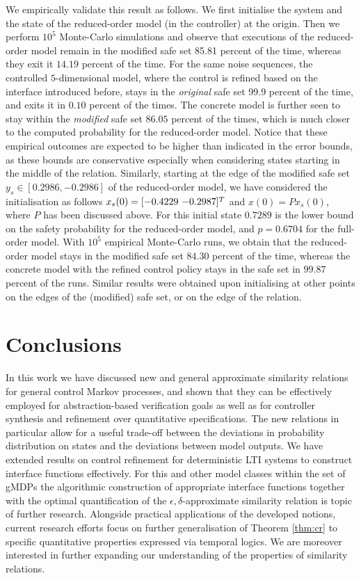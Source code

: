 \documentclass[letterpaper, 10 pt, conference]{amsart}
\theoremstyle{definition}
\theoremstyle{example}
\theoremstyle{remark}
\newcommand{\eps}{\epsilon}
\begin{document}
We empirically validate this result as follows. 
We first initialise the system and the state of the reduced-order model (in the controller)  at the origin. 
Then we perform $10^5$ Monte-Carlo simulations and observe that executions of the reduced-order model remain in the modified safe set 85.81 percent of the time, 
whereas they exit it $14.19$ percent of the time.   
For the same noise sequences,   
the controlled $5$-dimensional model, 
where the control is refined based on the interface introduced before, 
stays in the \emph{original} safe set 99.9 percent of the time, and exits it in $0.10$ percent of the times. 
The concrete model is further seen to stay within the \emph{modified} safe set $86.05$ percent of the times, 
which is much closer to the computed probability for the reduced-order model. 
Notice that these empirical outcomes are expected to be higher than indicated in the error bounds, 
as these bounds are conservative especially when considering states starting in the middle of the relation. 
Similarly, starting at the edge of the modified safe set $y_{s}\in[ 0.2986, -0.2986]$ of the reduced-order model, 
we have considered the initialisation as follows $x_s(0)=\cramped{[ -0.4229\  {-0.2987}]^T}$ and $x(0)=Px_s(0)$, 
where $P$ has been discussed above. 
For this initial state $0.7289$ is the lower bound on the safety probability for the reduced-order model, and $p= 0.6704$ for the full-order model.  
With $10^5$ empirical Monte-Carlo runs, 
we obtain that the reduced-order model stays in the modified safe set $84.30$ percent of the time, 
whereas the concrete model with the refined control policy stays in the safe set in $99.87$ percent of the runs. 
Similar results were obtained upon initialising at other points on the edges of the (modified) safe set, 
or on the edge of the relation. 
 


\section{Conclusions}

In this work we have discussed new and general approximate similarity relations for general control Markov processes, 
and shown that they can be effectively employed for abstraction-based verification goals as well as for controller synthesis and refinement over quantitative specifications.    
The new relations in particular allow for a useful trade-off between the deviations in probability distribution on states and the deviations between model outputs. 
We have extended results on control refinement for deterministic LTI systems to construct interface functions effectively. For this and other model classes within the set of gMDPs the algorithmic construction of appropriate interface functions together with the optimal quantification of the $\eps,\delta$-approximate similarity relation is topic of further research. Alongside practical applications of the developed notions, 
current research efforts focus on further generalisation of Theorem \ref{thm:cr} to specific quantitative properties expressed via temporal logics. 
We are moreover interested in further expanding our understanding of the properties of similarity relations.  
\end{document}
